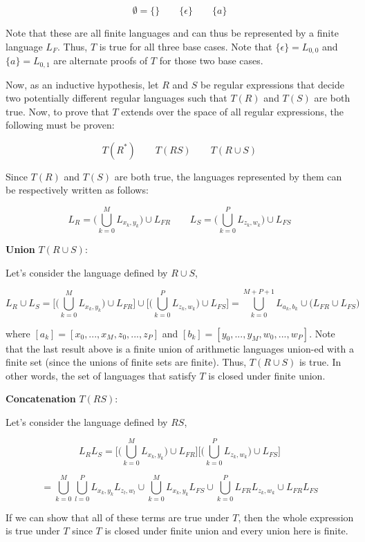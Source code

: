 \documentclass[11pt]{article}
\begin{document}
\begin{enumerate}
    $$\emptyset=\{\} \qquad \{\epsilon\} \qquad \{a\}$$

    Note that these are all finite languages and can thus be represented by a finite language $L_F$. Thus, $T$ is true for all three base cases. Note that $\{\epsilon\}=L_{0,0}$ and $\{a\} = L_{0,1}$ are alternate proofs of $T$ for those two base cases.

    Now, as an inductive hypothesis, let $R$ and $S$ be regular expressions that decide two potentially different regular languages such that $T(R)$ and $T(S)$ are both true. Now, to prove that $T$ extends over the space of all regular expressions, the following must be proven:

    $$T(R^*) \qquad T(RS) \qquad T(R \cup S)$$

    Since $T(R)$ and $T(S)$ are both true, the languages represented by them can be respectively written as follows:

    $$L_R = \big(\bigcup_{k=0}^{M} L_{x_k, y_k}\big) \cup L_{FR} \qquad L_S = \big(\bigcup_{k=0}^{P} L_{z_k, w_k}\big) \cup L_{FS}$$

    \textbf{Union} $T(R \cup S)$:

    Let's consider the language defined by $R \cup S$,

    $$L_R \cup L_S = \big[\big(\bigcup_{k=0}^{M} L_{x_k, y_k}\big) \cup L_{FR}\big] \cup \big[\big(\bigcup_{k=0}^{P} L_{z_k, w_k}\big) \cup L_{FS}\big] = \bigcup_{k=0}^{M+P+1} L_{a_k, b_k} \cup \big( L_{FR} \cup L_{FS} \big)$$

    where $[a_k] = [x_0, ..., x_M, z_0, ..., z_P]$ and $[b_k] = [y_0, ..., y_M, w_0, ..., w_P]$. Note that the last result above is a finite union of arithmetic languages union-ed with a finite set (since the unions of finite sets are finite). Thus, $T(R \cup S)$ is true. In other words, the set of languages that satisfy $T$ is closed under finite union.

    \textbf{Concatenation} $T(RS)$:
   
    Let's consider the language defined by $RS$,

    $$L_R L_S = \big[\big(\bigcup_{k=0}^{M} L_{x_k, y_k}\big) \cup L_{FR}\big]\big[\big(\bigcup_{k=0}^{P} L_{z_k, w_k}\big) \cup L_{FS}\big]$$

    $$ = \bigcup_{k=0}^{M} \bigcup_{l=0}^{P} L_{x_k, y_k} L_{z_l, w_l} \cup \bigcup_{k=0}^{M} L_{x_k, y_k}L_{FS} \cup \bigcup_{k=0}^{P} L_{FR}L_{z_k, w_k} \cup L_{FR}L_{FS}$$

    If we can show that all of these terms are true under $T$, then the whole expression is true under $T$ since $T$ is closed under finite union and every union here is finite.


\end{enumerate}
\end{document}
